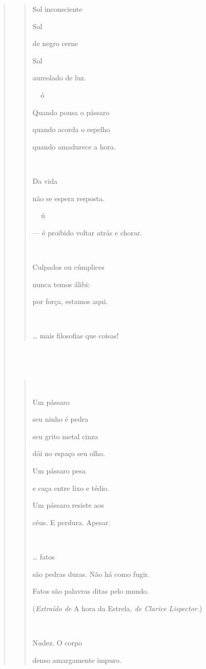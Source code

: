 \begin{verse}
\begin{quote}
Sol inconsciente

Sol

de negro cerne

Sol

aureolado de luz.

ó

Quando pousa o pássaro

quando acorda o espelho

quando amadurece a hora.



Da vida

não se espera resposta.

 ú

--- é proibido voltar atrás e chorar.



Culpados ou cúmplices

nunca temos álibi:

por força, estamos aqui.



\ldots{} mais filosofias que coisas!
\end{quote}

\subsection{ }\label{section-11}

\begin{quote}
 

Um pássaro

seu ninho é pedra

seu grito metal cinza

dói no espaço seu olho.

Um pássaro pesa

e caça entre lixo e tédio.

Um pássaro resiste aos

céus. E perdura. Apesar.



\ldots{} fatos

são pedras duras. Não há como fugir.

Fatos são palavras ditas pelo mundo.

(\emph{Extraído de} A hora da Estrela\emph{, de Clarice Lispector.})



Nudez. O corpo

denso amargamente impuro.


\end{quote}
\end{verse}
